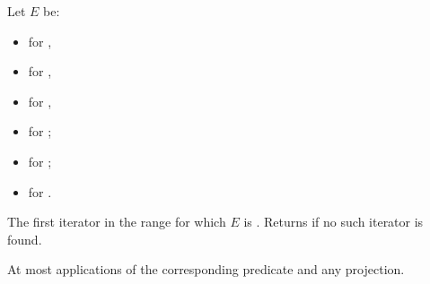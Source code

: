 \begin{itemdescr}
\pnum
Let $E$ be:
\begin{itemize}
\item {} for ,
\item {} for ,
\item {} for ,
\item {} for ;
\item {} for ;
\item {} for .
\end{itemize}

\pnum
\returns
The first iterator  in the range 
for which $E$ is .
Returns  if no such iterator is found.

\pnum
\complexity
At most  applications
of the corresponding predicate and any projection.
\end{itemdescr}
